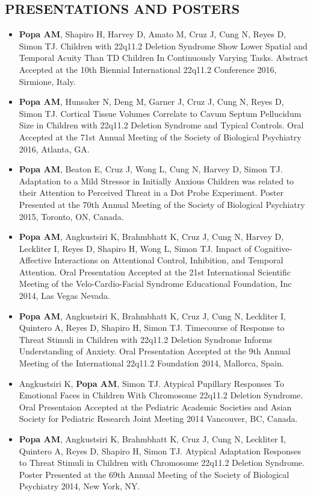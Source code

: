 \documentclass[line,margin,10pt]{res}
\begin{document}
\begin{resume}
\section{PRESENTATIONS AND POSTERS} 
\begin{itemize} \itemsep -2pt
\item \textbf{Popa AM}, Shapiro H, Harvey D, Amato M, Cruz J, Cung N, Reyes D, Simon TJ. Children with 22q11.2 Deletion Syndrome Show Lower Spatial and Temporal Acuity Than TD Children In Continuously Varying Tasks. Abstract Accepted at the 10th Biennial International 22q11.2 Conference 2016, Sirmione, Italy.
\item \textbf{Popa AM}, Hunsaker N, Deng M, Garner J, Cruz J, Cung N, Reyes D, Simon TJ. Cortical Tissue Volumes Correlate to Cavum Septum Pellucidum Size in Children with 22q11.2 Deletion Syndrome and Typical Controls. Oral Accepted at the 71st Annual Meeting of the Society of Biological Psychiatry 2016, Atlanta, GA.
\item \textbf{Popa AM}, Beaton E, Cruz J, Wong L, Cung N, Harvey D, Simon TJ. Adaptation to a Mild Stressor in Initially Anxious Children was related to their Attention to Perceived Threat in a Dot Probe Experiment. Poster Presented at the 70th Annual Meeting of the Society of Biological Psychiatry 2015, Toronto, ON, Canada.
\item \textbf{Popa AM}, Angkustsiri K, Brahmbhatt K, Cruz J, Cung N, Harvey D, Leckliter I, Reyes D, Shapiro H, Wong L, Simon TJ. Impact of Cognitive-Affective Interactions on Attentional Control, Inhibition, and Temporal Attention. Oral Presentation Accepted at the 21st International Scientific Meeting of the Velo-Cardio-Facial Syndrome Educational Foundation, Inc 2014, Las Vegas Nevada.
\item \textbf{Popa AM}, Angkustsiri K, Brahmbhatt K, Cruz J, Cung N, Leckliter I, Quintero A, Reyes D, Shapiro H, Simon TJ. Timecourse of Response to Threat Stimuli in Children with 22q11.2 Deletion Syndrome Informs Understanding of Anxiety. Oral Presentation Accepted at the 9th Annual Meeting of the International 22q11.2 Foundation 2014, Mallorca, Spain.
\item Angkustsiri K, \textbf{Popa AM}, Simon TJ. Atypical Pupillary Responses To Emotional Faces in Children With Chromosome 22q11.2 Deletion Syndrome. Oral Presentaion Accepted at the Pediatric Academic Societies and Asian Society for Pediatric Research Joint Meeting 2014 Vancouver, BC, Canada.
\item \textbf{Popa AM}, Angkustsiri K, Brahmbhatt K, Cruz J, Cung N, Leckliter I, Quintero A, Reyes D, Shapiro H, Simon TJ. Atypical Adaptation  Responses to Threat Stimuli in Children with Chromosome 22q11.2 Deletion Syndrome. Poster Presented at the 69th Annual Meeting of the Society of Biological Psychiatry 2014, New York, NY.

\end{itemize}
\end{resume}
\end{document}
